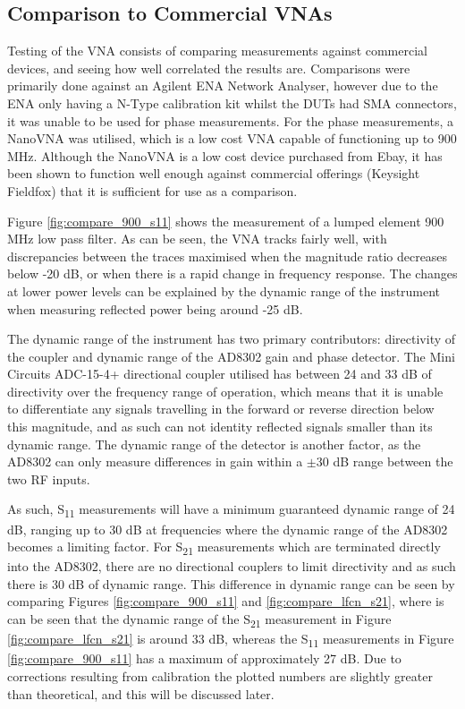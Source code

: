 \subsection{Comparison to Commercial VNAs}

Testing of the VNA consists of comparing measurements against commercial devices, and seeing how well correlated the results are. Comparisons were primarily done against an Agilent ENA Network Analyser, however due to the ENA only having a N-Type calibration kit whilst the DUTs had SMA connectors, it was unable to be used for phase measurements. For the phase measurements, a NanoVNA was utilised, which is a low cost VNA capable of functioning up to 900 MHz. Although the NanoVNA is a low cost device purchased from Ebay, it has been shown to function well enough against commercial offerings (Keysight Fieldfox) \cite{nanoVNA} that it is sufficient for use as a comparison. 

Figure \ref{fig:compare_900_s11} shows the measurement of a lumped element 900 MHz low pass filter. As can be seen, the VNA tracks fairly well, with discrepancies between the traces maximised when the magnitude ratio decreases below -20 dB, or when there is a rapid change in frequency response. The changes at lower power levels can be explained by the dynamic range of the instrument when measuring reflected power being around -25 dB.

The dynamic range of the instrument has two primary contributors: directivity of the coupler and dynamic range of the AD8302 gain and phase detector. The Mini Circuits ADC-15-4+ directional coupler utilised has between 24 and 33 dB of directivity over the frequency range of operation, which means that it is unable to differentiate any signals travelling in the forward or reverse direction below this magnitude, and as such can not identity reflected signals smaller than its dynamic range. The dynamic range of the detector is another factor, as the AD8302 can only measure differences in gain within a $\pm$30 dB range between the two RF inputs. 

As such, S\textsubscript{11} measurements will have a minimum guaranteed dynamic range of 24 dB, ranging up to 30 dB at frequencies where the dynamic range of the AD8302 becomes a limiting factor. For S\textsubscript{21} measurements which are terminated directly into the AD8302, there are no directional couplers to limit directivity and as such there is 30 dB of dynamic range. This difference in dynamic range can be seen by comparing Figures \ref{fig:compare_900_s11} and \ref{fig:compare_lfcn_s21}, where is can be seen that the dynamic range of the S\textsubscript{21} measurement in Figure \ref{fig:compare_lfcn_s21} is around 33 dB, whereas the S\textsubscript{11} measurements in Figure \ref{fig:compare_900_s11} has a maximum of approximately 27 dB. Due to corrections resulting from calibration the plotted numbers are slightly greater than theoretical, and this will be discussed later. 

